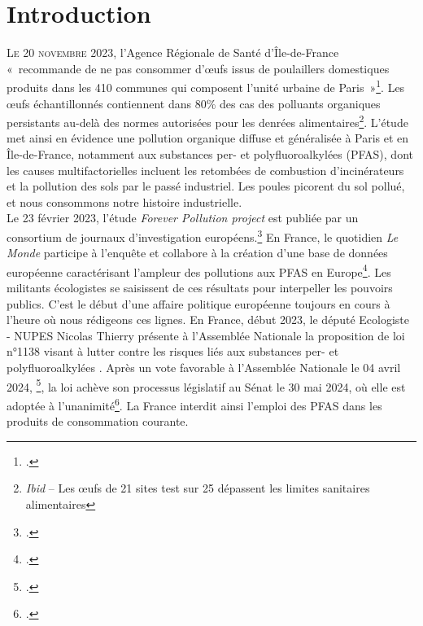 \documentclass[a4paper,twoside,12pt]{book}
\begin{document}
\clearpage
\thispagestyle{empty}
\cleardoublepage



\mainmatter


\chapter*{Introduction}

\lettrine{L}{e 20 novembre 2023,} l’Agence Régionale de Santé d’Île-de-France « recommande de ne pas consommer d’œufs issus de poulaillers domestiques produits dans les 410 communes qui composent l’unité urbaine de Paris »\footcite{ars_idf_contamination_2023}. Les œufs échantillonnés contiennent dans 80\% des cas des polluants organiques persistants au-delà des normes autorisées pour les denrées alimentaires\footnote{\textit{Ibid} – Les œufs de 21 sites test sur 25 dépassent les limites sanitaires alimentaires}. L’étude met ainsi en évidence une pollution organique diffuse et généralisée à Paris et en Île-de-France, notamment aux substances per- et polyfluoroalkylées (PFAS), dont les causes multifactorielles incluent les retombées de combustion d’incinérateurs et la pollution des sols par le passé industriel. Les poules picorent du sol pollué, et nous consommons notre histoire industrielle. \\
	
Le 23 février 2023, l'étude \textit{Forever Pollution project} est publiée par un consortium de journaux d'investigation européens.\footcite{collectif_de_journalistes_forever_2023} En France, le quotidien \textit{Le Monde} participe à l'enquête et collabore à la création d'une base de données européenne caractérisant l'ampleur des pollutions aux PFAS en Europe\footcite{horel_stephane__2023}. Les militants écologistes se saisissent de ces résultats pour interpeller les pouvoirs publics. C'est le début d'une affaire politique européenne toujours en cours à l'heure où nous rédigeons ces lignes. En France, début 2023, le député Ecologiste - NUPES  Nicolas Thierry présente à l'Assemblée Nationale la proposition de loi n°1138 \og visant à lutter contre les risques liés aux substances per- et polyfluoroalkylées \fg{}. Après un vote favorable à l'Assemblée Nationale le 04 avril 2024, \footcite{le_monde_deputes_2024}, la loi achève son processus législatif au Sénat le 30 mai 2024, où elle est adoptée à l'unanimité\footcite{le_monde_pfas_2024}. La France interdit ainsi l'emploi des PFAS dans les produits de consommation courante. 
\end{document}

